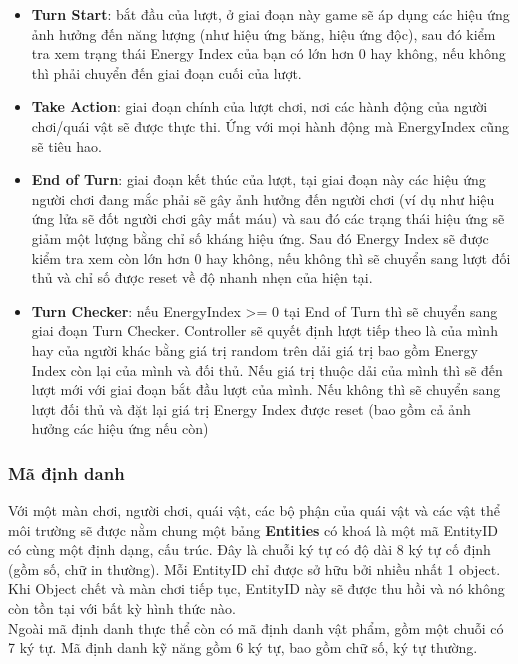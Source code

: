 \begin{itemize}
	\item \textbf{Turn Start}: bắt đầu của lượt, ở giai đoạn này game sẽ áp dụng các hiệu ứng ảnh hưởng đến năng lượng (như hiệu ứng băng, hiệu ứng độc), sau đó kiểm tra xem trạng thái Energy Index của bạn có lớn hơn 0 hay không, nếu không thì phải chuyển đến giai đoạn cuối của lượt.
	\item \textbf{Take Action}: giai đoạn chính của lượt chơi, nơi các hành động của người chơi/quái vật sẽ được thực thi. Ứng với mọi hành động mà EnergyIndex cũng sẽ tiêu hao.
	\item \textbf{End of Turn}: giai đoạn kết thúc của lượt, tại giai đoạn này các hiệu ứng người chơi đang mắc phải sẽ gây ảnh hưởng đến người chơi (ví dụ như hiệu ứng lửa sẽ đốt người chơi gây mất máu) và sau đó các trạng thái hiệu ứng sẽ giảm một lượng bằng chỉ số kháng hiệu ứng. Sau đó Energy Index sẽ được kiểm tra xem còn lớn hơn 0 hay không, nếu không thì sẽ chuyển sang lượt đối thủ và chỉ số được reset về độ nhanh nhẹn của hiện tại.
	\item \textbf{Turn Checker}: nếu EnergyIndex >= 0 tại End of Turn thì sẽ chuyển sang giai đoạn Turn Checker. Controller sẽ quyết định lượt tiếp theo là của mình hay của người khác bằng giá trị random trên dải giá trị bao gồm Energy Index còn lại của mình và đối thủ. Nếu giá trị thuộc dải của mình thì sẽ đến lượt mới với giai đoạn bắt đầu lượt của mình. Nếu không thì sẽ chuyển sang lượt đối thủ và đặt lại giá trị Energy Index được reset (bao gồm cả ảnh hưởng các hiệu ứng nếu còn) 
\end{itemize}
\subsubsection{Mã định danh}
\hspace*{0.5cm} Với một màn chơi, người chơi, quái vật, các bộ phận của quái vật và các vật thể môi trường sẽ được nằm chung một bảng \textbf{Entities} có khoá là một mã EntityID có cùng một định dạng, cấu trúc. Đây là chuỗi ký tự có độ dài 8 ký tự cố định (gồm số, chữ in thường). Mỗi EntityID chỉ được sở hữu bởi nhiều nhất 1 object. Khi Object chết và màn chơi tiếp tục, EntityID này sẽ được thu hồi và nó không còn tồn tại với bất kỳ hình thức nào.\\
\hspace*{0.5cm} Ngoài mã định danh thực thể còn có mã định danh vật phẩm, gồm một chuỗi có 7 ký tự. Mã định danh kỹ năng gồm 6 ký tự, bao gồm chữ số, ký tự thường.
